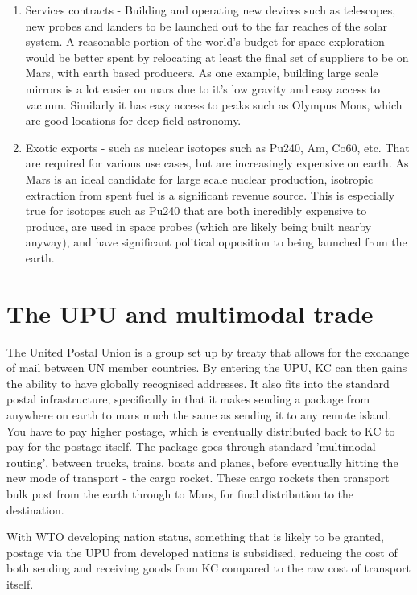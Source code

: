 \documentclass[10pt]{article}
\begin{document}
\begin{enumerate}
    \item Services contracts - Building and operating new devices such as telescopes, new probes and landers to be launched out to the far reaches of the solar system. A reasonable portion of the world's budget for space exploration would be better spent by relocating at least the final set of suppliers to be on Mars, with earth based producers. As one example, building large scale mirrors is a lot easier on mars due to it's low gravity and easy access to vacuum. Similarly it has easy access to peaks such as Olympus Mons, which are good locations for deep field astronomy.
    \item Exotic exports - such as nuclear isotopes such as Pu240, Am, Co60, etc. That are required for various use cases, but are increasingly expensive on earth. As Mars is an ideal candidate for large scale nuclear production, isotropic extraction from spent fuel is a significant revenue source. This is especially true for isotopes such as Pu240 that are both incredibly expensive to produce, are used in space probes (which are likely being built nearby anyway), and have significant political opposition to being launched from the earth.
\end{enumerate}

\section{The UPU and multimodal trade}
The United Postal Union is a group set up by treaty that allows for the exchange of mail between UN member countries. By entering the UPU, KC can then gains the ability to have globally recognised addresses. It also fits into the standard postal infrastructure, specifically in that it makes sending a package from anywhere on earth to mars much the same as sending it to any remote island. You have to pay higher postage, which is eventually distributed back to KC to pay for the postage itself. The package goes through standard 'multimodal routing', between trucks, trains, boats and planes, before eventually hitting the new mode of transport - the cargo rocket. These cargo rockets then transport bulk post from the earth through to Mars, for final distribution to the destination.

With WTO developing nation status, something that is likely to be granted, postage via the UPU from developed nations is subsidised, reducing the cost of both sending and receiving goods from KC compared to the raw cost of transport itself.
\end{document}
